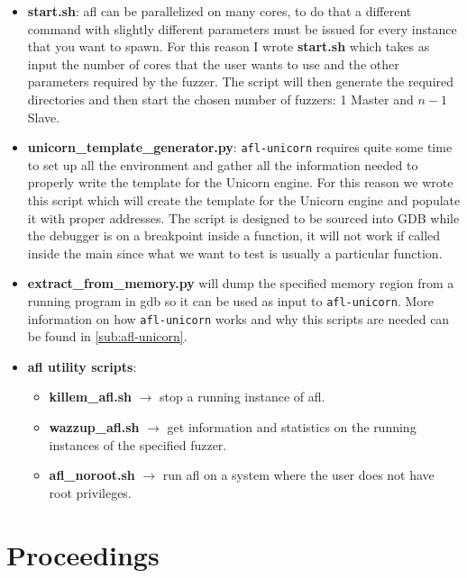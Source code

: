 \documentclass[../main.tex]{subfiles}
\begin{document}
\begin{itemize}

  \item \textbf{start.sh}: afl can be parallelized on many cores, to do that a
  different command with slightly different parameters must be issued for every
  instance that you want to spawn. For this reason I wrote \textbf{start.sh}
  which takes as input the number of cores that the  user wants to use and the
  other parameters required by the fuzzer. The script  will then generate the
  required directories and then start the chosen number  of fuzzers: 1 Master
  and $n-1$ Slave.

  \item \textbf{unicorn\_template\_generator.py}: \texttt{afl-unicorn} requires
  quite  some time to set up all the environment and gather all the information
  needed  to properly write the template for the Unicorn engine. For this reason
  we  wrote this script which will create the template for the Unicorn engine
  and  populate it with proper addresses. The script is designed to be sourced
  into  GDB while the debugger is on a breakpoint inside a function, it will not
  work  if called inside the main since what we want to test is usually a
  particular  function.

  \item \textbf{extract\_from\_memory.py} will dump the specified memory region from a running program in gdb so it can be used as input to \texttt{afl-unicorn}.  More information on how
  \texttt{afl-unicorn} works and why this scripts are needed can be found in \ref{sub:afl-unicorn}. %

  \item \textbf{afl utility scripts}:

  \begin{itemize}

    \item \textbf{killem\_afl.sh} $\rightarrow$ stop a running instance of afl.

    \item \textbf{wazzup\_afl.sh} $\rightarrow$  get information and statistics on the running instances of the specified fuzzer.

    \item \textbf{afl\_noroot.sh} $\rightarrow$ run afl on a system where the user does not have root privileges.

  \end{itemize}

\end{itemize}


\section{Proceedings}

\end{document}
